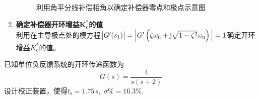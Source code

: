 \begin{enumerate}
\begin{figure}[!htb]
		\vspace*{-1em}
		\caption{利用角平分线补偿相角以确定补偿器零点和极点示意图}
		\label{根轨迹超前}
	\end{figure}
	\item \textbf{确定补偿器开环增益$\bm{K_\text{c}^*}$的值}\\
	利用在主导极点处的模方程$\big|G'(s_1)\big|=\Big|G'\left(\zeta \omega_{{\rm{n}}} + \text{j} \sqrt{1 - \zeta^2} \omega_{{\rm{n}}}\right)\Big| = 1$确定开环增益$K_\text{c}^*$的值。
\end{enumerate}

\examples \label{6.4}已知单位负反馈系统的开环传递函数为
\begin{equation}
	G(s) = \dfrac{4}{s(s+2)}
\end{equation}
设计校正装置，使得$t_\text{s} = 1.75 \, \text{s},\,\, \sigma \% = 16.3\%.$

